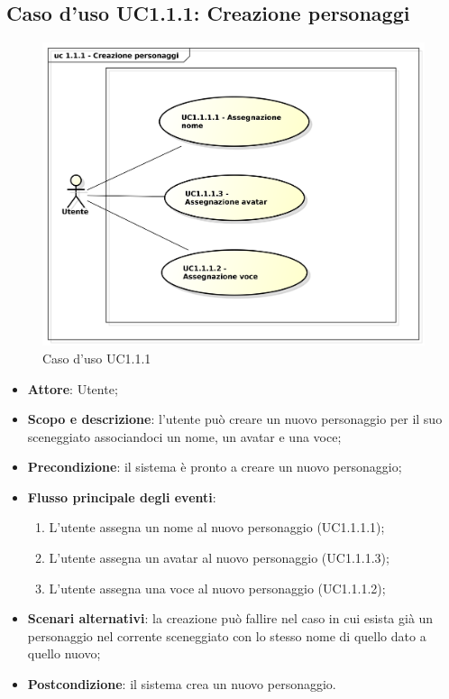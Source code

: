 \subsection{Caso d'uso UC1.1.1: Creazione personaggi}

\begin{figure}[htbp]
\centering
\includegraphics[scale=0.5]{UseCase_17_03_2016/immagini/uc_1_1_1_creazione_personaggi.png}
\captionsetup{labelfont=bf}
\caption{Caso d'uso UC1.1.1}
\end{figure}

\begin{itemize}
\item \textbf{Attore}: Utente;
\item \textbf{Scopo e descrizione}: l'utente può creare un nuovo personaggio per il suo sceneggiato associandoci un nome, un avatar e una voce;
\item \textbf{Precondizione}: il sistema è pronto a creare un nuovo personaggio;
\item \textbf{Flusso principale degli eventi}:
\begin{enumerate}
\item L'utente assegna un nome al nuovo personaggio (UC1.1.1.1);
\item L'utente assegna un avatar al nuovo personaggio (UC1.1.1.3);
\item L'utente assegna una voce al nuovo personaggio (UC1.1.1.2);
\end{enumerate} 
\item \textbf{Scenari alternativi}: la creazione può fallire nel caso in cui esista già un personaggio nel corrente sceneggiato con lo stesso nome di quello dato a quello nuovo;
\item \textbf{Postcondizione}: il sistema crea un nuovo personaggio.
\end{itemize}


